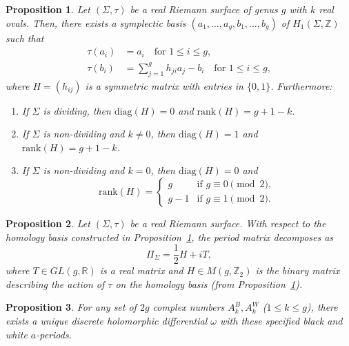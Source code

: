 \documentclass[10pt,a4paper]{amsart}
\newtheorem{proposition}{Proposition}
\newcommand{\R}{\mathds{R}}
\newcommand{\Z}{\mathds{Z}}
\begin{document}
\begin{proposition}\label{prop:realhomology}
	Let $(\Sigma,\tau)$ be a real Riemann surface of genus $g$ with $k$ real ovals. Then, there exists a symplectic basis $(a_1, \ldots, a_g, b_1, \ldots, b_g)$ of $H_1(\Sigma,\Z)$ such that
	\begin{align*}
		\tau(a_i) &= a_i \quad \text{for } 1 \leq i \leq g,\\
		\tau(b_i) &= \sum_{j=1}^g h_{ji} a_j - b_i \quad \text{for } 1 \leq i \leq g,
	\end{align*}
	where $H = (h_{ij})$ is a symmetric matrix with entries in $\{0,1\}$. Furthermore:
	\begin{enumerate}
		\item[(i)] If $\Sigma$ is dividing, then $\mathrm{diag}(H) = 0$ and $\mathrm{rank}(H) = g + 1 - k$.
		\item[(ii)] If $\Sigma$ is non-dividing and $k \neq 0$, then $\mathrm{diag}(H) = 1$ and $\mathrm{rank}(H) = g + 1 - k$.
		\item[(iii)] If $\Sigma$ is non-dividing and $k = 0$, then $\mathrm{diag}(H) = 0$ and
		\[
		\mathrm{rank}(H) =
		\begin{cases}
			g & \text{if } g \equiv 0 \pmod 2, \\
			g - 1 & \text{if } g \equiv 1 \pmod 2.
		\end{cases}
		\]
	\end{enumerate}
\end{proposition}

\begin{proposition}\label{prop:matrix_smooth}
	Let $(\Sigma, \tau)$ be a real Riemann surface. With respect to the homology basis constructed in Proposition~\ref{prop:realhomology}, the period matrix decomposes as
	\[
	\Pi_{\Sigma} = \frac{1}{2} H + i T,
	\]
	where $T \in GL(g, \R)$ is a real matrix and $H \in M(g, \Z_2)$ is the binary matrix describing the action of $\tau$ on the homology basis (from Proposition~\ref{prop:realhomology}).
\end{proposition}

\begin{proposition}\label{prop:holomorphic_existence}
	For any set of $2g$ complex numbers $A_k^B, A_k^W$ ($1 \leq k \leq g$), there exists a unique discrete holomorphic differential $\omega$ with these specified black and white $a$-periods.
\end{proposition}
\end{document}
